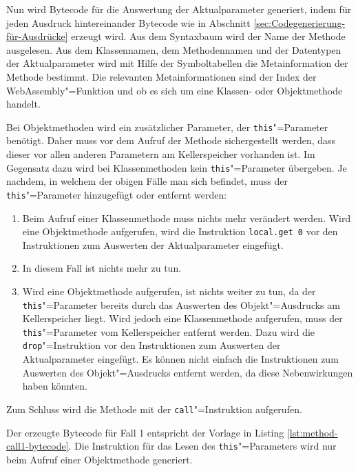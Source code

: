 Nun wird Bytecode für die Auswertung der Aktualparameter generiert, indem für jeden Ausdruck hintereinander Bytecode wie in Abschnitt \ref{sec:Codegenerierung-für-Ausdrücke} erzeugt wird. Aus dem Syntaxbaum wird der Name der Methode ausgelesen. Aus dem Klassennamen, dem Methodennamen und der Datentypen der Aktualparameter wird mit Hilfe der Symboltabellen die Metainformation der Methode bestimmt. Die relevanten Metainformationen sind der Index der WebAssembly"=Funktion und ob es sich um eine Klassen- oder Objektmethode handelt.

Bei Objektmethoden wird ein zusätzlicher Parameter, der \lstinline{this}"=Parameter benötigt. Daher muss vor dem Aufruf der Methode sichergestellt werden, dass dieser vor allen anderen Parametern am Kellerspeicher vorhanden ist. Im Gegensatz dazu wird bei Klassenmethoden kein \lstinline{this}"=Parameter übergeben. Je nachdem, in welchem der obigen Fälle man sich befindet, muss der \lstinline{this}"=Parameter hinzugefügt oder entfernt werden:

\begin{enumerate}
    \item Beim Aufruf einer Klassenmethode muss nichts mehr verändert werden. Wird eine Objektmethode aufgerufen, wird die Instruktion \lstinline{local.get 0} vor den Instruktionen zum Auswerten der Aktualparameter eingefügt.
    \item In diesem Fall ist nichts mehr zu tun.
    \item Wird eine Objektmethode aufgerufen, ist nichts weiter zu tun, da der \lstinline{this}"=Parameter bereits durch das Auswerten des Objekt"=Ausdrucks am Kellerspeicher liegt. Wird jedoch eine Klassenmethode aufgerufen, muss der \lstinline{this}"=Parameter vom Kellerspeicher entfernt werden. Dazu wird die \lstinline{drop}"=Instruktion vor den Instruktionen zum Auswerten der Aktualparameter eingefügt. Es können nicht einfach die Instruktionen zum Auswerten des Objekt"=Ausdrucks entfernt werden, da diese Nebenwirkungen haben könnten.
\end{enumerate}

Zum Schluss wird die Methode mit der \lstinline{call}"=Instruktion aufgerufen.

Der erzeugte Bytecode für Fall 1 entspricht der Vorlage in Listing \ref{lst:method-call1-bytecode}. Die Instruktion für das Lesen des \lstinline{this}"=Parameters wird nur beim Aufruf einer Objektmethode generiert. 



